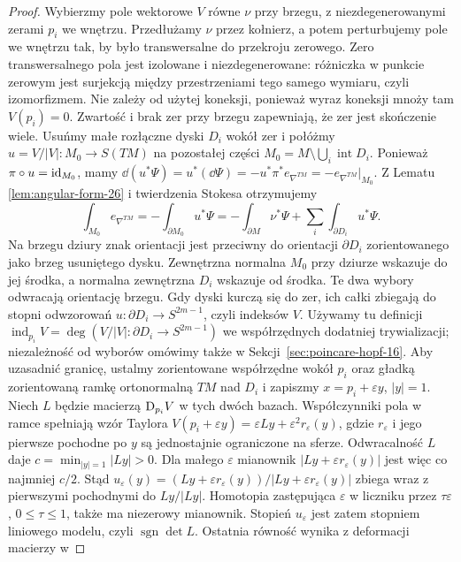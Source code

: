 \begin{proof}
Wybierzmy pole wektorowe $V$
równe $\nu$ przy brzegu,
z niezdegenerowanymi zerami $p_i$
we wnętrzu. Przedłużamy
$\nu$ przez kołnierz,
a potem perturbujemy pole
we wnętrzu tak, by było transwersalne
do przekroju zerowego.
Zero transwersalnego pola jest izolowane i niezdegenerowane:
różniczka w punkcie zerowym jest surjekcją między
przestrzeniami tego samego wymiaru, czyli izomorfizmem.
Nie zależy od użytej koneksji, ponieważ wyraz koneksji
mnoży tam $V(p_i)=0$.
Zwartość i brak zer przy brzegu zapewniają, że zer jest skończenie wiele.
Usuńmy małe
rozłączne dyski $D_i$
wokół zer i połóżmy
$u=V/|V|:M_0\to S(TM)$ na pozostałej
części $M_0=M\setminus\bigcup_i\operatorname{int}D_i$.
Ponieważ $\pi\circ u=\mathrm{id}_{M_0}$, mamy
$\dd(u^*\Psi)=u^*(\dd\Psi)=-u^*\pi^*e_{\nabla^{TM}}
=-e_{\nabla^{TM}}|_{M_0}$.
Z Lematu
\ref{lem:angular-form-26}
i twierdzenia Stokesa
otrzymujemy
\[
 \int_{M_0}e_{\nabla^{TM}}
 =-\int_{\partial M_0}u^*\Psi
 =-\int_{\partial M}\nu^*\Psi
   +\sum_i\int_{\partial D_i}u^*\Psi.
\]
Na brzegu dziury znak orientacji
jest przeciwny do orientacji
$\partial D_i$ zorientowanego jako brzeg usuniętego dysku.
Zewnętrzna normalna $M_0$ przy dziurze wskazuje do jej środka,
a normalna zewnętrzna $D_i$ wskazuje od środka.
Te dwa wybory odwracają orientację brzegu.
Gdy dyski
kurczą się do zer, ich
całki zbiegają do stopni
odwzorowań
$u:\partial D_i\to S^{2m-1}$,
czyli indeksów $V$.
Używamy tu definicji
$\operatorname{ind}_{p_i}V=\deg(V/|V|:\partial D_i\to S^{2m-1})$
we współrzędnych dodatniej trywializacji;
niezależność od wyborów omówimy także w
Sekcji~\ref{sec:poincare-hopf-16}.
Aby uzasadnić granicę,
ustalmy zorientowane współrzędne wokół $p_i$
oraz gładką zorientowaną ramkę ortonormalną
$TM$ nad $D_i$ i zapiszmy
$x=p_i+\varepsilon y$, $|y|=1$.
Niech $L$ będzie macierzą $\mathrm D_{p_i}V$
w tych dwóch bazach. Współczynniki pola w ramce
spełniają wzór Taylora
$V(p_i+\varepsilon y)=\varepsilon Ly+\varepsilon^2r_\varepsilon(y)$,
gdzie $r_\varepsilon$ i jego pierwsze pochodne po $y$
są jednostajnie ograniczone na sferze.
Odwracalność $L$ daje $c=\min_{|y|=1}|Ly|>0$.
Dla małego $\varepsilon$ mianownik
$|Ly+\varepsilon r_\varepsilon(y)|$ jest więc co najmniej $c/2$.
Stąd
$u_\varepsilon(y)
=(Ly+\varepsilon r_\varepsilon(y))/|Ly+\varepsilon r_\varepsilon(y)|$
zbiega wraz z pierwszymi pochodnymi do $Ly/|Ly|$.
Homotopia zastępująca $\varepsilon$ w liczniku przez
$\tau\varepsilon$, $0\leq\tau\leq1$, także ma niezerowy mianownik.
Stopień $u_\varepsilon$ jest zatem stopniem liniowego modelu,
czyli $\operatorname{sgn}\det L$.
Ostatnia równość wynika z deformacji macierzy w

\end{proof}

